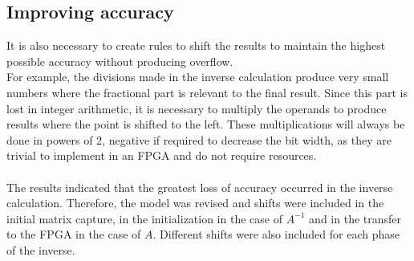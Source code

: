 \subsection{Improving accuracy}
It is also necessary to create rules to shift the results to maintain the highest possible accuracy without producing overflow.
\\
For example, the divisions made in the inverse calculation produce very small numbers where the fractional part is relevant to the final result. Since this part is lost in integer arithmetic, it is necessary to multiply the operands to produce results where the point is shifted to the left. These multiplications will always be done in powers of 2, negative if required to decrease the bit width, as they are trivial to implement in an FPGA and do not require resources.
\\
\\
The results indicated that the greatest loss of accuracy occurred in the inverse calculation. Therefore, the model was revised and shifts were included in the initial matrix capture, in the initialization in the case of $A^{-1}$ and in the transfer to the FPGA in the case of $A$. Different shifts were also included for each phase of the inverse.